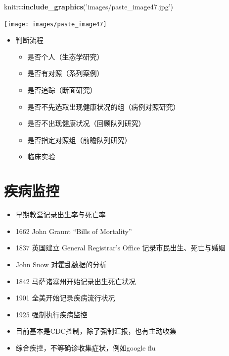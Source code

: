\documentclass[
]{book}
\newenvironment{Shaded}{\begin{snugshade}}{\end{snugshade}}
\newcommand{\KeywordTok}[1]{\textcolor[rgb]{0.13,0.29,0.53}{\textbf{#1}}}
\newcommand{\NormalTok}[1]{#1}
\newcommand{\OperatorTok}[1]{\textcolor[rgb]{0.81,0.36,0.00}{\textbf{#1}}}
\newcommand{\StringTok}[1]{\textcolor[rgb]{0.31,0.60,0.02}{#1}}
\providecommand{\tightlist}{%
  \setlength{\itemsep}{0pt}\setlength{\parskip}{0pt}}
\begin{document}
\begin{Shaded}
\begin{Highlighting}[]
\NormalTok{knitr}\OperatorTok{::}\KeywordTok{include_graphics}\NormalTok{(}\StringTok{'images/paste_image47.jpg'}\NormalTok{)}
\end{Highlighting}
\end{Shaded}

\texttt{[image: images/paste\_image47]}

\begin{itemize}
\tightlist
\item
  判断流程

  \begin{itemize}
  \tightlist
  \item
    是否个人（生态学研究）
  \item
    是否有对照（系列案例）
  \item
    是否追踪（断面研究）
  \item
    是否不先选取出现健康状况的组（病例对照研究）
  \item
    是否不出现健康状况（回顾队列研究）
  \item
    是否指定对照组（前瞻队列研究）
  \item
    临床实验
  \end{itemize}
\end{itemize}

\hypertarget{ux75beux75c5ux76d1ux63a7}{%
\section{疾病监控}\label{ux75beux75c5ux76d1ux63a7}}

\begin{itemize}
\tightlist
\item
  早期教堂记录出生率与死亡率
\item
  1662 John Graunt ``Bills of Mortality''
\item
  1837 英国建立 General Registrar's Office 记录市民出生、死亡与婚姻
\item
  John Snow 对霍乱数据的分析
\item
  1842 马萨诸塞州开始记录出生死亡状况
\item
  1901 全美开始记录疾病流行状况
\item
  1925 强制执行疾病监控
\item
  目前基本是CDC控制，除了强制汇报，也有主动收集
\item
  综合疾控，不等确诊收集症状，例如google flu
\end{itemize}
\end{document}
